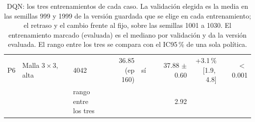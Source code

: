 \begin{table}[H]
\begin{tabular}{lllrlrrr}
P6 & \makecell[l]{Malla $3 \times 3$,\\{}alta} & 4042 & \makecell[r]{36.85\\{}(ep 160)} & sí & \makecell[r]{37.88\\{}$\pm$ 0.60} & \makecell[r]{+3.1\,\%\\{}[1.9,\,4.8]} & $<$\,0.001 \\
 & & \makecell[l]{rango entre\\{}los tres} & & & 2.92 & & \\
\bottomrule
\end{tabular}
\caption[Entrenamientos de DQN]{DQN: los tres entrenamientos de cada caso. La validación elegida es la media en las semillas 999 y 1999 de la versión guardada que se elige en cada entrenamiento; el retraso y el cambio frente al fijo, sobre las semillas 1001 a 1030. El entrenamiento marcado (evaluada) es el mediano por validación y da la versión evaluada. El rango entre los tres se compara con el IC95\,\% de una sola política.}
\label{tab:veredicto-bases-dqn}
\end{table}

